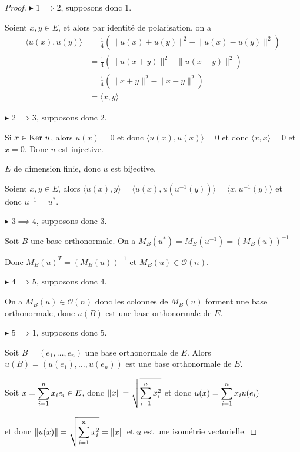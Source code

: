 \begin{proof}
    $\blacktriangleright$ $1 \implies 2$, supposons donc 1. 

    Soient $x, y \in E$, et alors par identité de polarisation, on a 
    \begin{align}
        \langle u(x), u(y) \rangle & = \frac 1 4 \left( \| u(x) + u(y) \|^2 - \| u(x) - u(y) \|^2 \right) \\
        & = \frac 1 4 \left( \| u(x + y) \|^2 - \| u(x - y) \|^2 \right) \\
        & = \frac 1 4 \left( \| x + y \|^2 - \| x - y \|^2 \right) \\
        & = \langle x, y \rangle
    \end{align}

    \avspace $\blacktriangleright$ $2 \implies 3$, supposons donc 2.

    Si $x \in \operatorname{Ker} \, u$, alors $u(x) = 0$ et donc $\langle u(x), u(x) \rangle = 0$ et donc 
    $\langle x, x \rangle = 0$ et $x = 0$. Donc $u$ est injective.

    $E$ de dimension finie, donc $u$ est bijective.

    \avspace Soient $x, y \in E$, alors $\langle u(x), y \rangle = \langle u(x), u(u^{-1}(y)) \rangle = \langle x, u^{-1}(y) \rangle$ 
    et donc $u^{-1} = u^*$.
    
    \avspace $\blacktriangleright$ $3 \implies 4$, supposons donc 3.

    Soit $B$ une base orthonormale. On a $M_B(u^*) = M_B(u^{-1}) = (M_B(u))^{-1}$ 

    Donc $M_B(u)^T = (M_B(u))^{-1}$ et $M_B(u) \in \mathcal O(n)$.

    \avspace $\blacktriangleright$ $4 \implies 5$, supposons donc 4.

    On a $M_B(u) \in \mathcal O(n)$ donc les colonnes de $M_B(u)$ forment une base orthonormale, 
    donc $u(B)$ est une base orthonormale de $E$.

    \avspace $\blacktriangleright$ $5 \implies 1$, supposons donc 5.

    Soit $B = (e_1, \dots, e_n)$ une base orthonormale de $E$. Alors $u(B) = (u(e_1), \dots, u(e_n))$ est une base orthonormale de $E$.

    Soit $x = \displaystyle \sum_{i = 1}^{n } x_i e_i \in E$, donc $\|x\| = \displaystyle \sqrt{\sum_{i = 1}^n x_i^2}$ 
    et donc $u(x) = \displaystyle \sum_{i = 1}^{n } x_i u(e_i)$ 

    et donc $\| u(x) \| = \displaystyle \sqrt{\sum_{i = 1}^n x_i^2} = \| x \|$ et $u$ est une isométrie vectorielle.
\end{proof}


